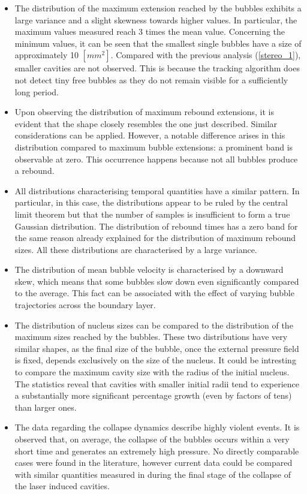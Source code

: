 \begin{itemize}
    \item The distribution of the maximum extension reached by the bubbles exhibits a large variance and a slight skewness towards higher values. In particular, the maximum values measured reach 3 times the mean value. Concerning the minimum values, it can be seen that the smallest single bubbles have a size of approximately 10 $[mm^2]$. Compared with the previous analysis (\ref{stereo_1}), smaller cavities are not observed. This is because the tracking algorithm does not detect tiny free bubbles as they do not remain visible for a sufficiently long period. 
    
    \item Upon observing the distribution of maximum rebound extensions, it is evident that the shape closely resembles the one just described. Similar considerations can be applied. However, a notable difference arises in this distribution compared to maximum bubble extensions: a prominent band is observable at zero. This occurrence happens because not all bubbles produce a rebound.

    \item All distributions characterising temporal quantities have a similar pattern. In particular, in this case, the distributions appear to be ruled by the central limit theorem but that the number of samples is insufficient to form a true Gaussian distribution. 
    The distribution of rebound times has a zero band for the same reason already explained for the distribution of maximum rebound sizes.
    All these distributions are characterised by a large variance.
    
    \item The distribution of mean bubble velocity is characterised by a downward skew, which means that some bubbles slow down even significantly compared to the average. This fact can be associated with the effect of varying bubble trajectories across the boundary layer.
    
    \item The distribution of nucleus sizes can be compared to the distribution of the maximum sizes reached by the bubbles. These two distributions have very similar shapes, as the final size of the bubble, once the external pressure field is fixed, depends exclusively on the size of the nucleus. 
    It could be intresting to compare the maximum cavity size with the radius of the initial nucleus. 
    The statistics reveal that cavities with smaller initial radii tend to experience a substantially more significant percentage growth (even by factors of tens) than larger ones.
    
    \item The data regarding the collapse dynamics describe highly violent events. It is observed that, on average, the collapse of the bubbles occurs within a very short time and generates an extremely high pressure. 
    No directly comparable cases were found in the literature, however current data could be compared with similar quantities measured in \cite{Brujan2008} during the final stage of the collapse of the laser induced cavities.
    
\end{itemize}

